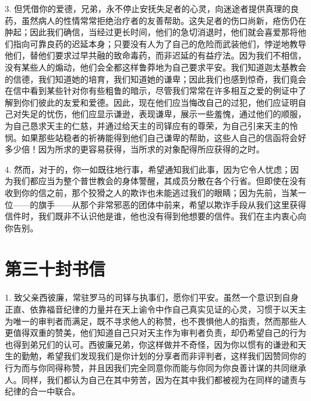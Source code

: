 3. 但凭借你的爱德，兄弟，永不停止安抚失足者的心灵，向迷途者提供真理的良药，虽然病人的性情常常拒绝治疗者的友善帮助。这失足者的伤口尚新，疮伤仍在肿起；因此我们确信，当经过更长时间，他们的急切消退时，他们就会喜爱那将他们指向可靠良药的迟延本身；只要没有人为了自己的危险而武装他们，悖逆地教导他们，替他们要求过早共融的致命毒药，而非迟延的有益疗法。因为我们不相信，没有某些人的煽动，他们会全都这样鲁莽地为自己要求平安。我们知道迦太基教会的信德，我们知道她的培育，我们知道她的谦卑；因此我们也感到惊奇，我们竟会在信中看到某些针对你有些粗鲁的暗示，尽管我们常常在许多相互之爱的例证中了解到你们彼此的友爱和爱德。因此，现在他们应当悔改自己的过犯，他们应证明自己对失足的忧伤，他们应显示谦逊，表现谦卑，展示一些羞愧，通过他们的顺服，为自己恳求天主的仁慈，并通过给天主的司铎应有的尊荣，为自己引来天主的怜悯。如果那些站稳者的祈祷能得到他们自己谦卑的帮助，这些人自己的信函将会好多少倍！因为所求的更容易获得，当所求的对象配得所应获得的之时。\par

4. 然而，对于的，你一如既往地行事，希望通知我们此事，因为它令人忧虑；因为我们都应当为整个普世教会的身体警醒，其成员分散在各个行省。但即使在没有收到你的信之前，那个狡猾之人的欺诈也未能逃过我们的眼睛；因为先前，当某一位——的旗手——从那个非常邪恶的团体中前来，希望以欺诈手段从我们这里获得信件时，我们既非不认识他是谁，他也没有得到他想要的信件。我们在主内衷心向你告别。\par



\section{第三十封书信}

\par

\par

1. 致父亲西彼廉，常驻罗马的司铎与执事们，愿你们平安。虽然一个意识到自身正直、依靠福音纪律的力量并在天上谕令中作自己真实见证的心灵，习惯于以天主为唯一的审判者而满足，既不寻求他人的称赞，也不畏惧他人的指责，然而那些人更值得双重的赞美，他们知道自己只对天主作为审判者负责，却仍希望自己的行为也得到弟兄们的认可。西彼廉兄弟，你这样做并不奇怪，因为你以惯有的谦逊和天生的勤勉，希望我们发现我们是你计划的分享者而非评判者，这样我们因赞同你的行为而与你同得称赞，并且因我们完全同意你而能与你同为你良善计谋的共同继承人。同样，我们都认为自己在其中劳苦，因为在其中我们都被视为在同样的谴责与纪律的合一中联合。\par

